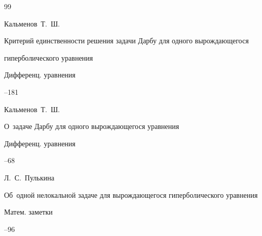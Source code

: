 \begin{thebibliography}{99}

\by Кальменов~Т.~Ш.

\paper Критерий единственности решения задачи Дарбу для одного вырождающегося

гиперболического уравнения

\jour Дифференц. уравнения




--181











\by Кальменов~Т.~Ш.

\paper О~задаче Дарбу для одного вырождающегося уравнения

\jour Дифференц. уравнения




--68









\by Л.~С.~Пулькина

\paper Об~одной нелокальной задаче для вырождающегося гиперболического уравнения

\jour Матем. заметки




--96





\end{thebibliography}
